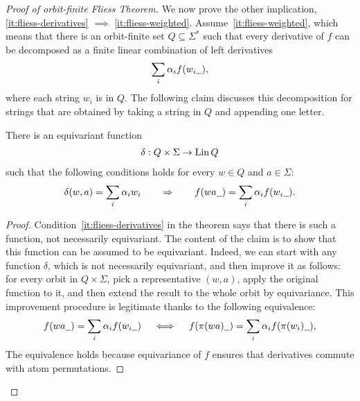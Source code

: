 \begin{theorem}
\begin{proof}[Proof of orbit-finite Fliess Theorem]
    We now prove the other implication, \ref{it:fliess-derivatives} $\implies$ \ref{it:fliess-weighted}. Assume~\ref{it:fliess-weighted}, which means that   there is an orbit-finite set $Q \subseteq \Sigma^*$ such that every derivative of $f$ can be decomposed as a finite linear combination of left derivatives
    \begin{align*}
            \sum_i \alpha_i f(w_i\underline{\hspace{2mm}}),
        \end{align*}
        where each string $w_i$ is in $Q$. The following claim discusses this decomposition for strings that are obtained by taking a string in $Q$ and appending one letter. 
        \begin{claim}
            There is an equivariant function 
        \begin{align*}
       \delta :  Q \times \Sigma \to \operatorname{Lin} Q
        \end{align*}
        such that the following conditions holds for every $w \in Q$ and $a \in \Sigma$:
        \begin{align*}
        \delta(w,a) = 
        \sum_i \alpha_i w_i 
        \qquad \Rightarrow \qquad 
        f(wa\underline{\hspace{2mm}}) = \sum_i \alpha_i f(w_i\underline{\hspace{2mm}}).
        \end{align*}
        \end{claim}
    \begin{proof}
        Condition~\ref{it:fliess-derivatives} in the theorem says that there is such a function, not necessarily equivariant. The content of the claim is to show that this function can be assumed to be equivariant. Indeed, we can start with any function $\delta$, which is not necessarily equivariant, and then improve it as follows:  for every orbit in $Q \times \Sigma$,  pick a representative $(w,a)$, apply the original function to it, and then extend the result to the whole orbit by equivariance. This improvement  procedure is legitimate thanks to the following equivalence: 
        \begin{align*}
                    f(wa\underline{\hspace{2mm}}) = \sum_i \alpha_i f(w_i\underline{\hspace{2mm}})
                    \quad \iff \quad 
                            f(\pi(wa)\underline{\hspace{2mm}}) = \sum_i \alpha_i f(\pi(w_i)\underline{\hspace{2mm}}),
        \end{align*}
        The equivalence holds  because equivariance of $f$ ensures that  derivatives commute with atom permutations.
    \end{proof}        


\end{proof}
\end{theorem}

